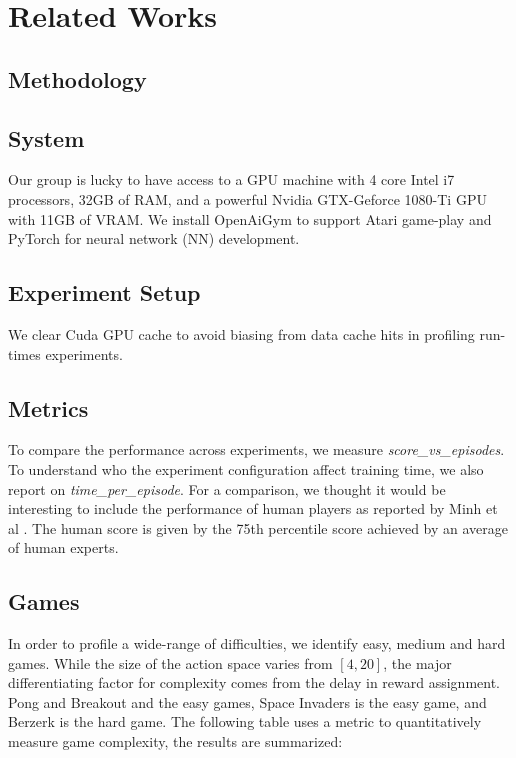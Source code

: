 \documentclass{article} %
\begin{document}
\section{Related Works}





\subsection{Methodology}

\subsection{System} Our group is lucky to have access to a GPU machine with 4 core Intel i7 processors, 32GB of RAM, and a powerful  Nvidia GTX-Geforce 1080-Ti GPU with 11GB of VRAM. We install OpenAiGym \cite{aigym} to support Atari game-play and PyTorch \cite{pytorch} for neural network (NN) development. 


\subsection{Experiment Setup} We clear Cuda GPU cache to avoid biasing from data cache hits in profiling run-times experiments.

\subsection{Metrics} \label{metrics}
To compare the performance across experiments, we measure \textit{score\_vs\_episodes}. To understand who the experiment configuration affect training time, we also report on \textit{time\_per\_episode}. For a comparison, we thought it would be interesting to include the performance of human players as reported by Minh et al \cite{a3c}. The human score is given by the 75th percentile score achieved by an average of human experts. 

\subsection{Games} In order to profile a wide-range of difficulties, we identify easy, medium and hard games. While the size of the action space varies from $[4,20]$, the major differentiating factor for complexity comes from the delay in reward assignment. Pong and Breakout and the easy games, Space Invaders is the easy game, and Berzerk is the hard game. The following table uses a metric to quantitatively measure game complexity, the results are summarized:
\end{document}
